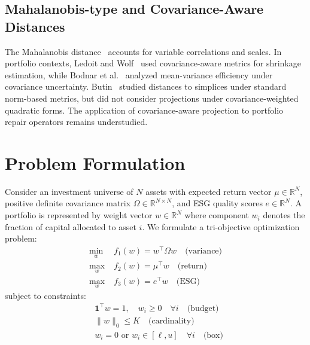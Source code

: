\documentclass[10pt,twocolumn,a4paper]{article}
\begin{document}
\subsection{Mahalanobis-type and Covariance-Aware Distances}

The Mahalanobis distance~\cite{mahalanobis1936generalised} accounts for variable correlations and scales. In portfolio contexts, Ledoit and Wolf~\cite{ledoit2004honey, ledoit2020analytical} used covariance-aware metrics for shrinkage estimation, while Bodnar et al.~\cite{bodnar2020efficiency} analyzed mean-variance efficiency under covariance uncertainty. Butin~\cite{butin2020generalized} studied distances to simplices under standard norm-based metrics, but did not consider projections under covariance-weighted quadratic forms. The application of covariance-aware projection to portfolio repair operators remains understudied.

\section{Problem Formulation}
\label{sec:problem}

Consider an investment universe of $N$ assets with expected return vector $\mu \in \mathbb{R}^N$, positive definite covariance matrix $\Omega \in \mathbb{R}^{N \times N}$, and ESG quality scores $e \in \mathbb{R}^N$. A portfolio is represented by weight vector $w \in \mathbb{R}^N$ where component $w_i$ denotes the fraction of capital allocated to asset $i$. We formulate a tri-objective optimization problem:
\begin{align}
\min_{w} \; & f_1(w) = w^\top \Omega w \quad \text{(variance)} \label{eq:var} \\
\max_{w} \; & f_2(w) = \mu^\top w \quad \text{(return)} \label{eq:ret} \\
\max_{w} \; & f_3(w) = e^\top w \quad \text{(ESG)} \label{eq:esg}
\end{align}
subject to constraints:
\begin{align}
& \mathbf{1}^\top w = 1, \quad w_i \geq 0 \quad \forall i \quad \text{(budget)} \\
& \|w\|_0 \leq K \quad \text{(cardinality)} \\
& w_i = 0 \text{ or } w_i \in [\ell, u] \quad \forall i \quad \text{(box)}
\end{align}
\end{document}
